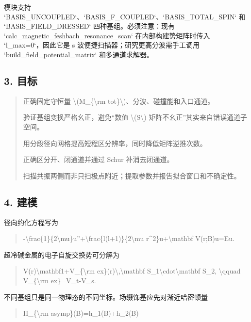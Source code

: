 \documentclass[UTF8,openany,11pt,fontset=fandol]{ctexbook}
\begin{document}
模块支持 `BASIS\_UNCOUPLED`、`BASIS\_F\_COUPLED`、`BASIS\_TOTAL\_SPIN`
和 `BASIS\_FIELD\_DRESSED` 四种基组。必须注意：现有
`calc\_magnetic\_feshbach\_resonance\_scan` 在内部构建势矩阵时传入
`l\_max=0`，因此它是 s 波便捷扫描器；研究更高分波需手工调用
`build\_field\_potential\_matrix` 和多通道求解器。

\subsection{\texorpdfstring{\textbf{3.
目标}}{3. 目标}}\label{ux76eeux6807-2}

\begin{quote}
正确固定守恒量 \textbackslash(M\_\{\textbackslash rm
tot\}\textbackslash)、分波、碰撞能和入口通道。

验证基组变换严格幺正，避免``数值 \textbackslash(S\textbackslash)
矩阵不幺正''其实来自错误通道子空间。

用分段径向网格提高短程区分辨率，同时降低矩阵逆推次数。

正确区分开、闭通道并通过 Schur 补消去闭通道。

扫描共振两侧而非只扫极点附近；提取参数并报告拟合窗口和不确定性。
\end{quote}

\subsection{\texorpdfstring{\textbf{4.
建模}}{4. 建模}}\label{ux5efaux6a21-2}

径向约化方程写为

\begin{quote}
-\textbackslash frac\{1\}\{2\textbackslash mu\}u''+\textbackslash frac\{l(l+1)\}\{2\textbackslash mu
r\^{}2\}u+\textbackslash mathbf V(r;B)u=Eu.
\end{quote}

超冷碱金属的电子自旋交换势可分解为

\begin{quote}
V(r)\textbackslash mathbf1+V\_\{\textbackslash rm
ex\}(r)\textbackslash,\textbackslash mathbf
S\_1\textbackslash cdot\textbackslash mathbf S\_2, \textbackslash qquad
V\_\{\textbackslash rm ex\}=V\_t-V\_s.
\end{quote}

不同基组只是同一物理态的不同坐标。场缀饰基应先对渐近哈密顿量

\begin{quote}
H\_\{\textbackslash rm asymp\}(B)=h\_1(B)+h\_2(B)
\end{quote}
\end{document}
